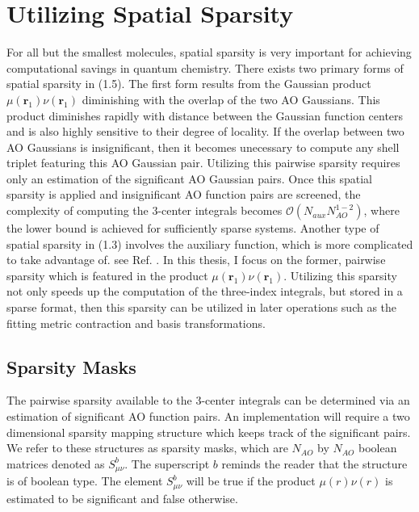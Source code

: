 \chapter{Utilizing Spatial Sparsity}

For all but the smallest molecules, spatial sparsity is very important for achieving computational savings
in quantum chemistry. There exists two primary forms of spatial sparsity in (1.5). The first form
results from the Gaussian product $\mu(\textbf{r}_{1}) \nu(\textbf{r}_{1})$ diminishing with the overlap of the 
two AO Gaussians. This product diminishes rapidly with distance between the Gaussian function centers and is also 
highly sensitive to their degree of locality.
If the overlap between two AO Gaussians is insignificant, then it becomes unecessary to compute any shell triplet featuring
this AO Gaussian pair.
Utilizing this pairwise sparsity requires only an estimation of the significant AO Gaussian pairs.
Once this spatial sparsity is applied and insignificant AO function pairs are screened, the complexity of 
computing the 3-center integrals becomes $\mathcal{O}(N_{aux}N_{AO}^{1-2})$, where the lower bound is achieved for sufficiently 
sparse systems. Another type of spatial sparsity in (1.3) involves the auxiliary function, which is more complicated to 
take advantage of. see Ref. \cite{Werner:2003:8149}. In this thesis, I focus on the former, pairwise sparsity which is featured
in the product $\mu(\textbf{r}_{1}) \nu(\textbf{r}_{1})$. 
Utilizing this sparsity not only speeds up the computation of the three-index integrals, but stored in a sparse format,
then this sparsity can be utilized in later operations such as the fitting metric contraction and basis transformations.

\section{Sparsity Masks}

The pairwise sparsity available to the 3-center integrals can be determined via an estimation of significant AO function pairs.
An implementation will require a two dimensional sparsity mapping structure which keeps track of the significant pairs.
We refer to these structures as sparsity masks, which are $N_{AO}$ by $N_{AO}$ boolean matrices denoted as $S_{\mu \nu}^b$. 
The superscript $b$ reminds the reader that the structure is of boolean type.
The element $S_{\mu \nu}^b$ will be true if the product $\mu(r)\nu(r)$ is estimated to be significant 
and false otherwise.


